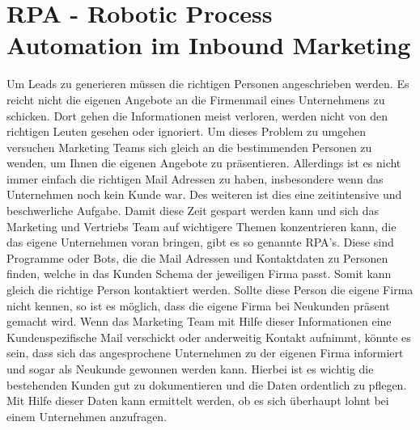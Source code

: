 \section{RPA - Robotic Process Automation im Inbound Marketing}
Um Leads zu generieren müssen die richtigen Personen angeschrieben werden. Es reicht nicht die eigenen Angebote an die Firmenmail eines Unternehmens zu schicken. Dort gehen die Informationen meist verloren, werden nicht von den richtigen Leuten gesehen oder ignoriert. Um dieses Problem zu umgehen versuchen Marketing Teams sich gleich an die bestimmenden Personen zu wenden, um Ihnen die eigenen Angebote zu präsentieren. Allerdings ist es nicht immer einfach die richtigen Mail Adressen zu haben, insbesondere wenn das Unternehmen noch kein Kunde war. Des weiteren ist dies eine zeitintensive und beschwerliche Aufgabe. 
\newline 
Damit diese Zeit gespart werden kann und sich das Marketing und Vertriebs Team auf wichtigere Themen konzentrieren kann, die das eigene Unternehmen voran bringen, gibt es so genannte RPA's. Diese sind Programme oder Bots, die die Mail Adressen und Kontaktdaten zu Personen finden, welche in das Kunden Schema der jeweiligen Firma passt. Somit kann gleich die richtige Person kontaktiert werden. Sollte diese Person die eigene Firma nicht kennen, so ist es möglich, dass die eigene Firma bei Neukunden präsent gemacht wird. Wenn das Marketing Team mit Hilfe dieser Informationen eine Kundenspezifische Mail verschickt oder anderweitig Kontakt aufnimmt, könnte es sein, dass sich das angesprochene Unternehmen zu der eigenen Firma informiert und sogar als Neukunde gewonnen werden kann. 
\newline 
Hierbei ist es wichtig die bestehenden Kunden gut zu dokumentieren und die Daten ordentlich zu pflegen. Mit Hilfe dieser Daten kann ermittelt werden, ob es sich überhaupt lohnt bei einem Unternehmen anzufragen. 	